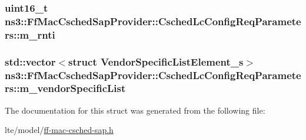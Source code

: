 \subsubsection[{\texorpdfstring{m\+\_\+rnti}{m_rnti}}]{\setlength{\rightskip}{0pt plus 5cm}uint16\+\_\+t ns3\+::\+Ff\+Mac\+Csched\+Sap\+Provider\+::\+Csched\+Lc\+Config\+Req\+Parameters\+::m\+\_\+rnti}\hypertarget{structns3_1_1FfMacCschedSapProvider_1_1CschedLcConfigReqParameters_a9cc4da30680707163260ad2750a90dd4}{}\label{structns3_1_1FfMacCschedSapProvider_1_1CschedLcConfigReqParameters_a9cc4da30680707163260ad2750a90dd4}
\subsubsection[{\texorpdfstring{m\+\_\+vendor\+Specific\+List}{m_vendorSpecificList}}]{\setlength{\rightskip}{0pt plus 5cm}std\+::vector$<$struct {\bf Vendor\+Specific\+List\+Element\+\_\+s}$>$ ns3\+::\+Ff\+Mac\+Csched\+Sap\+Provider\+::\+Csched\+Lc\+Config\+Req\+Parameters\+::m\+\_\+vendor\+Specific\+List}\hypertarget{structns3_1_1FfMacCschedSapProvider_1_1CschedLcConfigReqParameters_ad2114091a283051c400c786db77d2c21}{}\label{structns3_1_1FfMacCschedSapProvider_1_1CschedLcConfigReqParameters_ad2114091a283051c400c786db77d2c21}


The documentation for this struct was generated from the following file\+:\begin{DoxyCompactItemize}
\item 
lte/model/\hyperlink{ff-mac-csched-sap_8h}{ff-\/mac-\/csched-\/sap.\+h}\end{DoxyCompactItemize}
